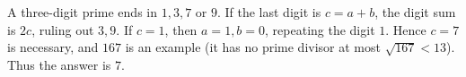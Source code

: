 A three-digit prime ends in $1,3,7$ or $9$. If the last digit is $c=a+b$, the digit sum is $2c$, ruling out $3,9$. If $c=1$, then $a=1,b=0$, repeating the digit $1$. Hence $c=7$ is necessary, and $167$ is an example (it has no prime divisor at most $\sqrt{167}<13$). Thus the answer is $\boxed7$.
